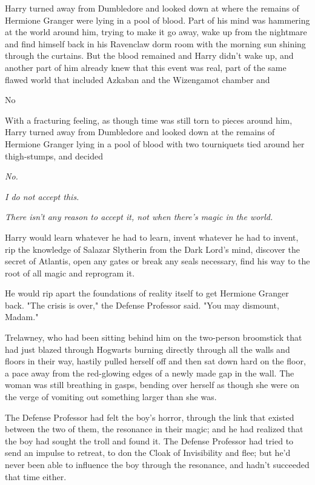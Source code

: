 Harry turned away from Dumbledore and looked down at where the remains of
Hermione Granger were lying in a pool of blood. Part of his mind was hammering
at the world around him, trying to make it go away, wake up from the nightmare
and find himself back in his Ravenclaw dorm room with the morning sun shining
through the curtains. But the blood remained and Harry didn't wake up, and
another part of him already knew that this event was real, part of the same
flawed world that included Azkaban and the Wizengamot chamber and

No

With a fracturing feeling, as though time was still torn to pieces around him,
Harry turned away from Dumbledore and looked down at the remains of Hermione
Granger lying in a pool of blood with two tourniquets tied around her
thigh-stumps, and decided

\emph{No.}

\emph{I do not accept this.}

\emph{There isn't any reason to accept it, not when there's magic in the world.}

Harry would learn whatever he had to learn, invent whatever he had to invent,
rip the knowledge of Salazar Slytherin from the Dark Lord's mind, discover the
secret of Atlantis, open any gates or break any seals necessary, find his way
to the root of all magic and reprogram it.

He would rip apart the foundations of reality itself to get Hermione Granger
back.
\sbreak
"The crisis is over," the Defense Professor said. "You may dismount, Madam."

Trelawney, who had been sitting behind him on the two-person broomstick that
had just blazed through Hogwarts burning directly through all the walls and
floors in their way, hastily pulled herself off and then sat down hard on the
floor, a pace away from the red-glowing edges of a newly made gap in the wall.
The woman was still breathing in gasps, bending over herself as though she were
on the verge of vomiting out something larger than she was.

The Defense Professor had felt the boy's horror, through the link that existed
between the two of them, the resonance in their magic; and he had realized that
the boy had sought the troll and found it. The Defense Professor had tried to
send an impulse to retreat, to don the Cloak of Invisibility and flee; but he'd
never been able to influence the boy through the resonance, and hadn't
succeeded that time either.

